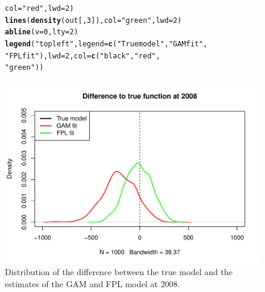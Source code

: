 \documentclass{article}\usepackage[]{graphicx}\usepackage[]{color}
\makeatletter
\newcommand{\hlnum}[1]{\textcolor[rgb]{0.686,0.059,0.569}{#1}}%
\newcommand{\hlstr}[1]{\textcolor[rgb]{0.192,0.494,0.8}{#1}}%
\newcommand{\hlstd}[1]{\textcolor[rgb]{0.345,0.345,0.345}{#1}}%
\newcommand{\hlkwc}[1]{\textcolor[rgb]{0.333,0.667,0.333}{#1}}%
\newcommand{\hlkwd}[1]{\textcolor[rgb]{0.737,0.353,0.396}{\textbf{#1}}}%
\newenvironment{kframe}{%
 \def\at@end@of@kframe{}%
 \ifinner\ifhmode%
  \def\at@end@of@kframe{\end{minipage}}%
  \begin{minipage}{\columnwidth}%
 \fi\fi%
 \def\FrameCommand##1{\hskip\@totalleftmargin \hskip-\fboxsep
 \colorbox{shadecolor}{##1}\hskip-\fboxsep
     \hskip-\linewidth \hskip-\@totalleftmargin \hskip\columnwidth}%
 \MakeFramed {\advance\hsize-\width
   \@totalleftmargin\z@ \linewidth\hsize
   \@setminipage}}%
 {\par\unskip\endMakeFramed%
 \at@end@of@kframe}
\newenvironment{knitrout}{}{} %
\makeatother
\begin{document}
\begin{figure}
\begin{knitrout}
\begin{kframe}
\begin{alltt}
    \hlkwc{col} \hlstd{=} \hlstr{"red"}\hlstd{,} \hlkwc{lwd} \hlstd{=} \hlnum{2}\hlstd{)}
\hlkwd{lines}\hlstd{(}\hlkwd{density}\hlstd{(out[,} \hlnum{3}\hlstd{]),} \hlkwc{col} \hlstd{=} \hlstr{"green"}\hlstd{,} \hlkwc{lwd} \hlstd{=} \hlnum{2}\hlstd{)}
\hlkwd{abline}\hlstd{(}\hlkwc{v} \hlstd{=} \hlnum{0}\hlstd{,} \hlkwc{lty} \hlstd{=} \hlnum{2}\hlstd{)}
\hlkwd{legend}\hlstd{(}\hlstr{"topleft"}\hlstd{,} \hlkwc{legend} \hlstd{=} \hlkwd{c}\hlstd{(}\hlstr{"True model"}\hlstd{,} \hlstr{"GAM fit"}\hlstd{,}
    \hlstr{"FPL fit"}\hlstd{),} \hlkwc{lwd} \hlstd{=} \hlnum{2}\hlstd{,} \hlkwc{col} \hlstd{=} \hlkwd{c}\hlstd{(}\hlstr{"black"}\hlstd{,} \hlstr{"red"}\hlstd{,}
    \hlstr{"green"}\hlstd{))}
\end{alltt}
\end{kframe}

\includegraphics[width=1\linewidth]{figure/plot8-1} \hfill{}



\end{knitrout}
\caption{Distribution of the difference between the true model and the estimates of the GAM and FPL model at 2008.}
\label{fig:plot8}
\end{figure}
\end{document}
